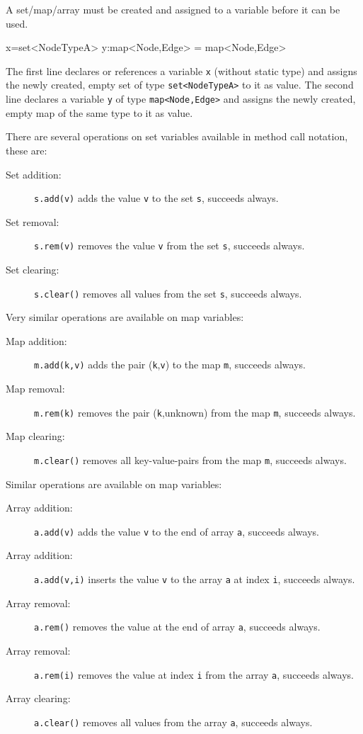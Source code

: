 A set/map/array must be created and assigned to a variable before it can be used.

\begin{example}
\begin{grgen}
x=set<NodeTypeA>{}
y:map<Node,Edge> = map<Node,Edge>{}
\end{grgen}
The first line declares or references a variable \texttt{x} (without static type) and assigns the newly created, empty set of type \texttt{set<NodeTypeA>} to it as value.
The second line declares a variable \texttt{y} of type \texttt{map<Node,Edge>} and assigns the newly created, empty map of the same type to it as value.
\end{example}

\noindent There are several operations on set variables available in method call notation, these are:

\begin{description}
\item[Set addition:] \texttt{s.add(v)} adds the value \texttt{v} to the set \texttt{s}, succeeds always.
\item[Set removal:] \texttt{s.rem(v)} removes the value \texttt{v} from the set \texttt{s}, succeeds always.
\item[Set clearing:] \texttt{s.clear()} removes all values from the set \texttt{s}, succeeds always.
\end{description}

\noindent Very similar operations are available on map variables:

\begin{description}
\item[Map addition:] \texttt{m.add(k,v)} adds the pair (\texttt{k},\texttt{v}) to the map \texttt{m}, succeeds always.
\item[Map removal:] \texttt{m.rem(k)} removes the pair (\texttt{k},unknown) from the map \texttt{m}, succeeds always.
\item[Map clearing:] \texttt{m.clear()} removes all key-value-pairs from the map \texttt{m}, succeeds always.
\end{description}

\noindent Similar operations are available on map variables:

\begin{description}
\item[Array addition:] \texttt{a.add(v)} adds the value \texttt{v} to the end of array \texttt{a}, succeeds always.
\item[Array addition:] \texttt{a.add(v,i)} inserts the value \texttt{v} to the array \texttt{a} at index \texttt{i}, succeeds always.
\item[Array removal:] \texttt{a.rem()} removes the value at the end of array \texttt{a}, succeeds always.
\item[Array removal:] \texttt{a.rem(i)} removes the value at index \texttt{i} from the array \texttt{a}, succeeds always.
\item[Array clearing:] \texttt{a.clear()} removes all values from the array \texttt{a}, succeeds always.
\end{description}

